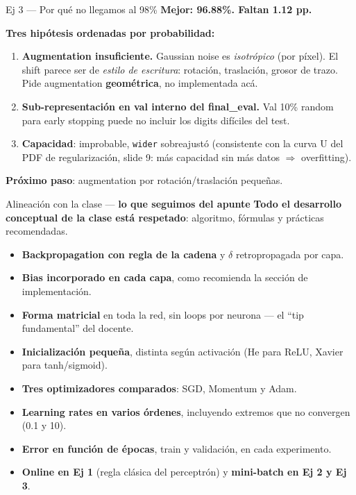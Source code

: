 \documentclass[11pt,aspectratio=169]{beamer}
\newcommand{\code}[1]{\texttt{\textcolor{accent}{#1}}}
\begin{document}
\begin{frame}{Ej 3 — Por qué no llegamos al 98\%}
\centering
\Large \textcolor{warn}{\textbf{Mejor: 96.88\%. Faltan 1.12 pp.}}\\[0.6em]

\normalsize\raggedright
\textbf{Tres hipótesis ordenadas por probabilidad:}
\begin{enumerate}\setlength\itemsep{0.2em}
  \item \textbf{Augmentation insuficiente.} Gaussian noise es \emph{isotrópico} (por píxel). El shift parece ser de \emph{estilo de escritura}: rotación, traslación, grosor de trazo. Pide augmentation \textbf{geométrica}, no implementada acá.
  \item \textbf{Sub-representación en val interno del final\_eval.} Val 10\% random para early stopping puede no incluir los digits difíciles del test.
  \item \textbf{Capacidad}: improbable, \code{wider} sobreajustó (consistente con la curva U del PDF de regularización, slide 9: más capacidad sin más datos $\Rightarrow$ overfitting).
\end{enumerate}
\vspace{0.4em}

\begin{takeaway}
\textbf{Próximo paso}: augmentation por rotación/traslación pequeñas.
\end{takeaway}
\end{frame}

\begin{frame}{Alineación con la clase — \textbf{lo que seguimos del apunte}}
\small\textbf{Todo el desarrollo conceptual de la clase está respetado}: algoritmo, fórmulas y prácticas recomendadas.\\[0.5em]

\begin{itemize}\setlength\itemsep{0.15em}\small
  \item \textbf{Backpropagation con regla de la cadena} y $\delta$ retropropagada por capa.
  \item \textbf{Bias incorporado en cada capa}, como recomienda la sección de implementación.
  \item \textbf{Forma matricial} en toda la red, sin loops por neurona — el ``tip fundamental'' del docente.
  \item \textbf{Inicialización pequeña}, distinta según activación (He para ReLU, Xavier para tanh/sigmoid).
  \item \textbf{Tres optimizadores comparados}: SGD, Momentum y Adam.
  \item \textbf{Learning rates en varios órdenes}, incluyendo extremos que no convergen (0.1 y 10).
  \item \textbf{Error en función de épocas}, train y validación, en cada experimento.
  \item \textbf{Online en Ej 1} (regla clásica del perceptrón) y \textbf{mini-batch en Ej 2 y Ej 3}.
\end{itemize}
\end{frame}
\end{document}
